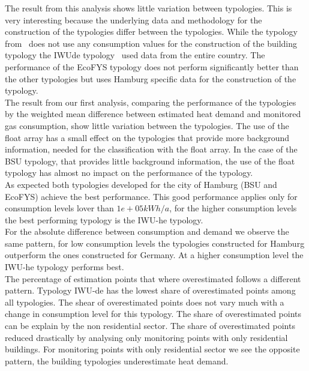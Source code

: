 The result from this analysis shows little variation between typologies. This
is very interesting because the underlying data and methodology for the
construction of the typologies differ between the typologies. While the
typology from~\cite{Blesl.2002} does not use any consumption values for the
construction of the building typology the IWUde typology~\cite{IWU.2003} used
data from the entire country. The performance of the EcoFYS typology does not
perform significantly better than the other typologies but uses Hamburg
specific data for the construction of the typology.\\

The result from our first analysis, comparing the performance of the typologies
by the weighted mean difference between estimated heat demand and monitored gas
consumption, show little variation between the typologies. The use of the float
array has a small effect on the typologies that provide more background
information, needed for the classification with the float array. In the case of
the BSU typology, that provides little background information, the use of the
float typology has almost no impact on the performance of the typology.\\

As expected both typologies developed for the city of Hamburg (BSU and EcoFYS)
achieve the best performance. This good performance applies only for
consumption levels lover than $1e+05 kWh/a$, for the higher consumption levels
the best performing typology is the IWU-he typology.\\ 

For the absolute difference between consumption and demand we observe the same
pattern, for low consumption levels the typologies constructed for Hamburg
outperform the ones constructed for Germany. At a higher consumption level the
IWU-he typology performs best.\\

The percentage of estimation points that where overestimated follows a
different pattern. Typology IWU-de has the lowest share of overestimated points
among all typologies. The shear of overestimated points does not vary much with
a change in consumption level for this typology.
The share of overestimated points can be explain by the non residential sector.
The share of overestimated points reduced drastically by analysing only
monitoring points with only residential buildings. For monitoring points with
only residential sector we see the opposite pattern, the building typologies
underestimate heat demand.\\

